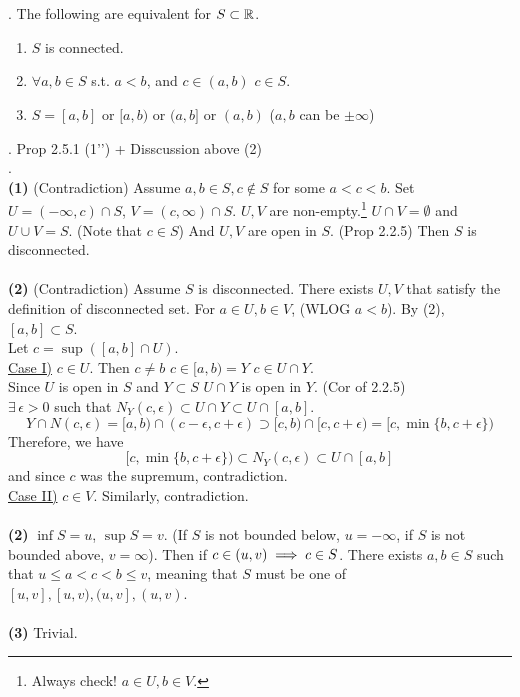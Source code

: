 \\
\\
\thm{}. The following are equivalent for $S\subset \mathbb{R}$.
\begin{enumerate}
	\item $S$ is connected.
	\item $\forall a, b\in S$ s.t. $a<b$, and $c\in (a, b)$ \mimp $c\in S$.
	\item $S = [a, b]$ or $[a, b)$ or $(a, b]$ or $(a, b)$ ($a, b$ can be $\pm\infty$)
\end{enumerate} 
\rmk. Prop 2.5.1 (1'') + Disscussion above (2)\\
\pf.\\
\textbf{(1)} (Contradiction) Assume $a, b\in S, c\notin S$ for some $a<c<b$. Set $U = (-\infty, c)\cap S$, $V = (c, \infty)\cap S$. $U, V$ are non-empty.\footnote{Always check! $a\in U, b\in V$.} $U \cap V = \emptyset$ and $U\cup V = S$. (Note that $c\in S$) And $U, V$ are open in $S$. (Prop 2.2.5) Then $S$ is disconnected.\\
\\
\textbf{(2)} (Contradiction) Assume $S$ is disconnected. There exists $U, V$ that satisfy the definition of disconnected set. For $a\in U, b\in V$, (WLOG $a<b$). By (2), $[a, b]\subset S$.\\
Let $c = \sup([a, b]\cap U)$.\\
\underline{Case I)} $c\in U$. Then $c\neq b$ \mimp $c\in [a, b) = Y$ \mimp $c\in U\cap Y$.\\
Since $U$ is open in $S$ and $Y\subset S$ \mimp $U\cap Y$ is open in $Y$. (Cor of 2.2.5)\\
\mimp $\exists\, \epsilon>0$ such that $N_Y(c, \epsilon) \subset U\cap Y \subset U\cap [a, b]$.
$$Y\cap N(c, \epsilon) = [a, b)\cap (c-\epsilon, c+\epsilon)\supset [c, b)\cap [c, c+\epsilon) = [c, \min\{b, c+\epsilon\})$$
Therefore, we have $$[c, \min\{b, c+\epsilon\}) \subset N_Y(c, \epsilon) \subset U\cap [a, b]$$
and since $c$ was the supremum, contradiction. 
\\
\underline{Case II)} $c\in V$. Similarly, contradiction.\\
\\
\textbf{(2)} $\inf S = u$, $\sup S = v$. (If $S$ is not bounded below, $u = -\infty$, if $S$ is not bounded above, $v = \infty$). Then if $c\in (u, v) \implies c\in S$. There exists $a, b\in S$ such that $u \leq a < c < b \leq v$, meaning that $S$ must be one of $[u, v], [u, v), (u, v], (u, v)$.\\
\\
\textbf{(3)} Trivial.
\pagebreak